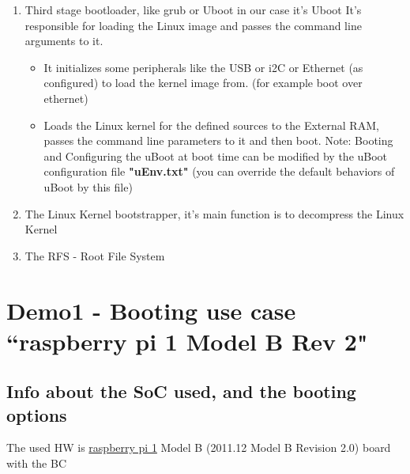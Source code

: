\documentclass{article}
\begin{document}
\begin{enumerate}
    \item Third stage bootloader, like grub or Uboot in our case it's Uboot
        It's responsible for loading the Linux image and passes the command line arguments to it.

        \begin{itemize}
            \item It initializes some peripherals like the USB or i2C or Ethernet (as configured) to load the kernel image from. (for example boot over ethernet)
            \item Loads the Linux kernel for the defined sources to the External RAM, passes the command line parameters to it and then boot. 
            Note: Booting and Configuring the uBoot at boot time can be modified by the uBoot configuration file \textbf{"uEnv.txt"} (you can override the default behaviors of uBoot by this file)
        \end{itemize} 

    \item The Linux Kernel bootstrapper, it's main function is to decompress the Linux Kernel
    \item The RFS - Root File System
\end{enumerate}


\section{Demo1 - Booting use case ``raspberry pi 1 Model B Rev 2"}
\subsection{Info about the SoC used, and the booting options}
The used HW is \href{https://raspberry-projects.com/pi/pi-hardware/raspberry-pi-model-b/model-b-io-pins}{raspberry pi 1} Model B (2011.12 Model B Revision 2.0) board with the BC
\end{document}
